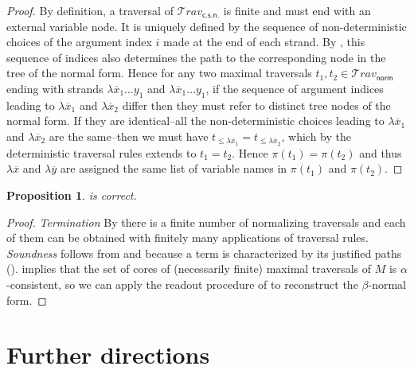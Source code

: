 \documentclass[xchauthor,chkrefs,GCNS,amsmath,amsthm,rotating,leaveRGB]{tcsg}
\theoremstyle{plain}
\newtheorem{proposition}[theorem]{Proposition}
\theoremstyle{definition}
\newcommand\travset{\mathcal{T}\!rav}
\newcommand{\normalizing}{\mathsf{norm}}
\newcommand{\travsetnorm}{\travset_{\normalizing}}
\newcommand{\travsetscn}{\travset_{\mathsf{c.s.n.}}}
\def\coresymbol{\pi}
\newcommand{\core}[1]{\coresymbol(#1)}
\begin{document}
\begin{proof}
By definition, a traversal of $\travsetscn $ is finite and must end with an
external variable node. It is uniquely defined by the sequence of
non-deterministic choices of the argument index $i$ made at the end of each
strand. By , this sequence of
indices also determines the path to the corresponding node in the tree of the
normal form. Hence for any two maximal traversals $t_{1},t_{2} \in
\travsetnorm $ ending with strands $\lambda \overline{x}_{1} \ldots y_{1}$
and $\lambda \overline{x}_{1} \ldots y_{1}$, if the sequence of argument
indices leading to $\lambda \overline{x}_{1}$ and $\lambda \overline{x}_{2}$
differ then they must refer to distinct tree nodes of the normal form. If
they are identical--all the non-deterministic choices leading to $\lambda
\overline{x}_{1}$ and $\lambda \overline{x}_{2}$ are the same--then we must
have $t_{\leq \lambda \overline{x}_{1}} = t_{\leq \lambda \overline{x}_{2}}$,
which by the deterministic traversal rules extends to $t_{1} = t_{2}$. Hence
$\core{t_{1}} = \core{t_{2}}$ and thus $\lambda \overline{x}$ and $\lambda
\overline{y}$ are assigned the same list of variable names in $\core{t_{1}}$
and $\core{t_{2}}$.
\end{proof}

\begin{proposition}
 is correct.
\end{proposition}

\begin{proof}
\emph{Termination}  By 
there is a finite number of normalizing traversals and each of them can be
obtained with finitely many applications of traversal rules. \emph{Soundness}
follows from  and because a term
is characterized by its justified paths
().
 implies
that the set of cores of (necessarily finite) maximal traversals of $M$ is
$\alpha $-consistent, so we can apply the readout procedure of
to reconstruct the $\beta $-normal form.
\end{proof}



\section{Further directions}\label{sec8}
\end{document}
